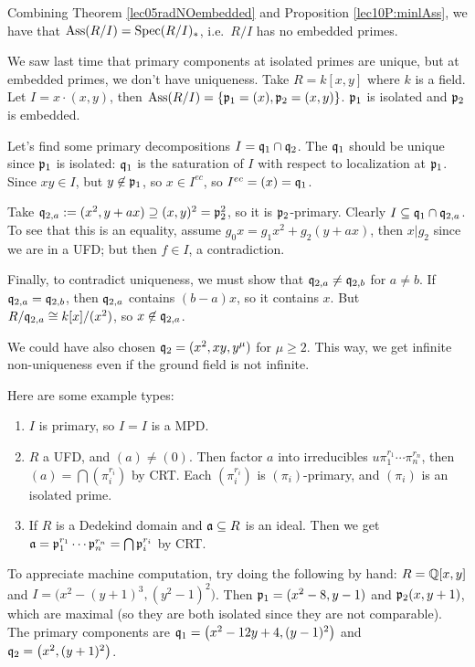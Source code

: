  \setcounter{lecture}{14}

 Combining Theorem \ref{lec05radNOembedded} and Proposition \ref{lec10P:minlAss}, we have
 that $\operatorname{Ass} (R/I) = \operatorname{Spec} (R/I)_*$, i.e.\ $R/I$ has no embedded primes.

 \begin{example}
  We saw last time that primary components at isolated primes are unique, but at embedded
  primes, we don't have uniqueness. Take $R=k[x,y]$ where $k$ is a field. Let $I=x\cdot
  (x,y)$, then $\operatorname{Ass} (R/I) = \{\mathfrak{p}_1=(x),\mathfrak{p}_2=(x,y)\}$. $\mathfrak{p}_1$ is isolated and $\mathfrak{p}_2$ is
  embedded.

  Let's find some primary decompositions $I=\mathfrak{q}_1\cap \mathfrak{q}_2$. The $\mathfrak{q}_1$ should be
  unique since $\mathfrak{p}_1$ is isolated: $\mathfrak{q}_1$ is the saturation of $I$ with respect to
  localization at $\mathfrak{p}_1$. Since $xy\in I$, but $y\not\in \mathfrak{p}_1$, so $x\in I^{ec}$, so
  $I^{ec}=(x)=\mathfrak{q}_1$.

  Take $\mathfrak{q}_{2,a}:=(x^2,y+ax)\supseteq (x,y)^2=\mathfrak{p}_2^2$, so it is $\mathfrak{p}_2$-primary. Clearly
  $I\subseteq \mathfrak{q}_1\cap \mathfrak{q}_{2,a}$. To see that this is an equality, assume
  $g_0x=g_1x^2+g_2(y+ax)$, then $x|g_2$ since we are in a UFD; but then $f\in I$, a
  contradiction.

  Finally, to contradict uniqueness, we must show that $\mathfrak{q}_{2,a}\neq \mathfrak{q}_{2,b}$ for $a\neq
  b$. If $\mathfrak{q}_{2,a}=\mathfrak{q}_{2,b}$, then $\mathfrak{q}_{2,a}$ contains $(b-a)x$, so it contains $x$. But
  $R/\mathfrak{q}_{2,a} \cong k[x]/(x^2)$, so $x\not\in \mathfrak{q}_{2,a}$.

  We could have also chosen $\mathfrak{q}_2 = (x^2,xy,y^\mu)$ for $\mu\ge 2$. This way, we get
  infinite non-uniqueness even if the ground field is not infinite.
 \end{example}
 \begin{example}
  Here are some example types:
  \begin{enumerate}
    \item $I$ is primary, so $I=I$ is a MPD.

    \item $R$ a UFD, and $(a)\neq (0)$. Then factor $a$ into irreducibles
    $u\pi_1^{r_1}\cdots \pi_n^{r_n}$, then $(a) = \bigcap (\pi_i^{r_i})$ by CRT. Each
    $(\pi_i^{r_i})$ is $(\pi_i)$-primary, and $(\pi_i)$ is an isolated prime.

    \item If $R$ is a Dedekind domain and $\mathfrak{a}\subseteq R$ is an ideal. Then we get
    $\mathfrak{a}=\mathfrak{p}_1^{r_1}\cdots \mathfrak{p}_n^{r_n} = \bigcap \mathfrak{p}_i^{r_i}$ by CRT.
  \end{enumerate}
 \end{example}
 \begin{example}
  To appreciate machine computation, try doing the following by hand: $R=\mathbb{Q}[x,y]$ and
  $I=\bigl(x^2-(y+1)^3,(y^2-1)^2\bigr)$. Then $\mathfrak{p}_1=(x^2-8,y-1)$ and $\mathfrak{p}_2(x,y+1)$, which
  are maximal (so they are both isolated since they are not comparable). The primary
  components are $\mathfrak{q}_1=\bigl(x^2-12y+4,(y-1)^2\bigr)$ and $\mathfrak{q}_2=\bigl( x^2 ,
  (y+1)^2\bigr)$.
 \end{example}

